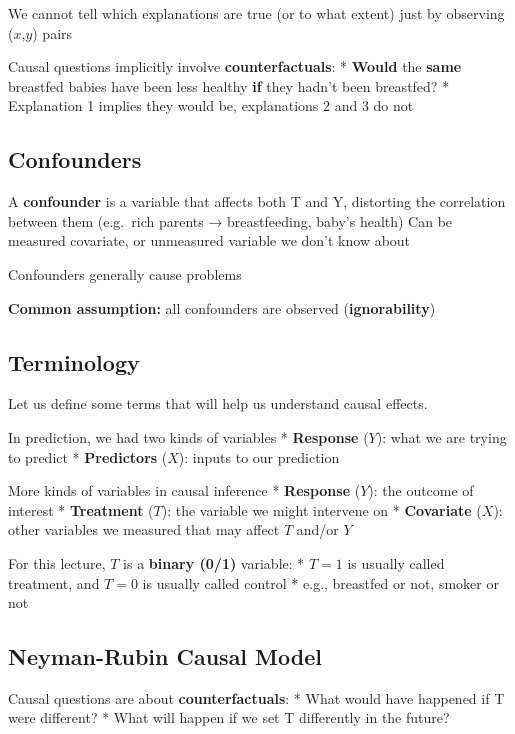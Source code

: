 \documentclass[
  letterpaper,
  DIV=11,
  numbers=noendperiod]{scrreprt}
\begin{document}
We cannot tell which explanations are true (or to what extent) just by
observing (\(x\),\(y\)) pairs

Causal questions implicitly involve \textbf{counterfactuals}: *
\textbf{Would} the \textbf{same} breastfed babies have been less healthy
\textbf{if} they hadn't been breastfed? * Explanation 1 implies they
would be, explanations 2 and 3 do not

\hypertarget{confounders}{%
\subsection{Confounders}\label{confounders}}

A \textbf{confounder} is a variable that affects both T and Y,
distorting the correlation between them (e.g.~rich parents →
breastfeeding, baby's health) Can be measured covariate, or unmeasured
variable we don't know about

Confounders generally cause problems

\textbf{Common assumption:} all confounders are observed
(\textbf{ignorability})

\hypertarget{terminology}{%
\subsection{Terminology}\label{terminology}}

Let us define some terms that will help us understand causal effects.

In prediction, we had two kinds of variables * \textbf{Response}
(\(Y\)): what we are trying to predict * \textbf{Predictors} (\(X\)):
inputs to our prediction

More kinds of variables in causal inference * \textbf{Response} (\(Y\)):
the outcome of interest * \textbf{Treatment} (\(T\)): the variable we
might intervene on * \textbf{Covariate} (\(X\)): other variables we
measured that may affect \(T\) and/or \(Y\)

For this lecture, \(T\) is a \textbf{binary (0/1)} variable: * \(T=1\)
is usually called treatment, and \(T=0\) is usually called control *
e.g., breastfed or not, smoker or not

\hypertarget{neyman-rubin-causal-model}{%
\subsection{Neyman-Rubin Causal Model}\label{neyman-rubin-causal-model}}

Causal questions are about \textbf{counterfactuals}: * What would have
happened if T were different? * What will happen if we set T differently
in the future?
\end{document}
